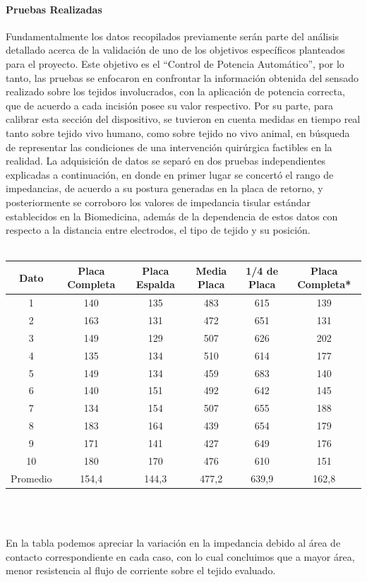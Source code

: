 \documentclass[12pt,letterpaper,spanish]{article}
\begin{document}
				\paragraph{Pruebas Realizadas}
				\hfill\break
Fundamentalmente los datos recopilados previamente serán parte del análisis detallado acerca de la validación de uno de los objetivos específicos planteados para el proyecto. Este objetivo es el “Control de Potencia Automático”, por lo tanto, las pruebas se enfocaron en confrontar la información obtenida del sensado realizado sobre los tejidos involucrados, con la aplicación de potencia correcta, que de acuerdo a cada incisión posee su valor respectivo.
Por su parte, para calibrar esta sección del dispositivo, se tuvieron en cuenta medidas en tiempo real tanto sobre tejido vivo humano, como sobre tejido no vivo animal, en búsqueda de representar las condiciones de una intervención quirúrgica factibles en la realidad.
La adquisición de datos se separó en dos pruebas independientes explicadas a continuación, en donde en primer lugar se concertó el rango de impedancias, de acuerdo a su postura generadas en la placa de retorno, y posteriormente se corroboro los valores de impedancia tisular estándar establecidos en la Biomedicina, además de la dependencia de estos datos con respecto a la distancia entre electrodos, el tipo de tejido y su posición. 
\\\

\begin{tabular}{|c|c|c|c|c|c|}
\hline 
Dato & Placa Completa & Placa Espalda & Media Placa & 1/4 de Placa & Placa Completa* \\ 
\hline 
1 & 140 & 135 & 483 & 615 & 139 \\ 
\hline 
2 & 163 & 131 & 472 & 651 & 131 \\ 
\hline 
3 & 149 & 129 & 507 & 626 & 202 \\ 
\hline 
4 & 135 & 134 & 510 & 614 & 177 \\ 
\hline 
5 & 149 & 134 & 459 & 683 & 140 \\ 
\hline 
6 & 140 & 151 & 492 & 642 & 145 \\ 
\hline 
7 & 134 & 154 & 507 & 655 & 188 \\ 
\hline 
8 & 183 & 164 & 439 & 654 & 179 \\ 
\hline 
9 & 171 & 141 & 427 & 649 & 176 \\ 
\hline 
10 & 180 & 170 & 476 & 610 & 151 \\ 
\hline
Promedio & 154,4 & 144,3 &477,2 & 639,9 & 162,8 \\ 
\hline
\end{tabular}
\\\

En la tabla podemos apreciar la variación en la impedancia debido al área de contacto correspondiente en cada caso, con lo cual concluimos que a mayor área, menor resistencia al flujo de corriente sobre el tejido evaluado.
\end{document}
